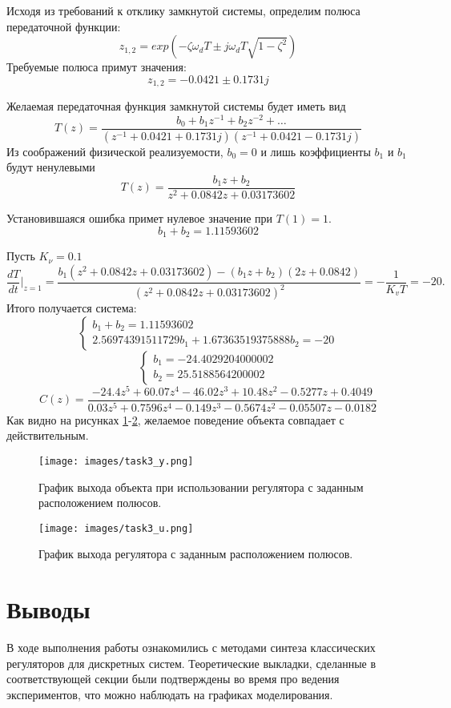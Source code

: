 \documentclass[a4paper, 14pt]{extarticle}
\theoremstyle{definition}
\theoremstyle{plain}
\theoremstyle{remark}
\begin{document}
Исходя из требований к отклику замкнутой системы, определим полюса передаточной функции:
\[z_{1,2} = exp(-\zeta \omega_d T \pm j \omega_d T \sqrt{1 - \zeta^2})\]
Требуемые полюса примут значения:
\[z_{1,2} = -0.0421 \pm 0.1731j \]

Желаемая передаточная функция замкнутой системы будет иметь вид
\[T(z) = \frac{b_0 + b_1 z^{-1} + b_2 z^{-2} + \dots}{(z^{-1} + 0.0421 + 0.1731j)(z^{-1}  + 0.0421 - 0.1731j)}\]
Из соображений физической реализуемости, \(b_0 = 0\) и лишь коэффициенты \(b_1\) и \(b_1\) будут ненулевыми
\[T(z) = \frac{b_1 z + b_2}{z^2 + 0.0842z + 0.03173602}\]

Установившаяся ошибка примет нулевое значение при \(T(1) = 1\).
\[b_1 + b_2 = 1.11593602\]

Пусть \(K_\nu  = 0.1\)
\[
\frac{dT}{dt} \Bigg|_{z=1} = \frac{b_1 ( z^2 + 0.0842z + 0.03173602) - ( b_1 z + b_2 ) ( 2z + 0.0842 )}{(  z^2 + 0.0842z + 0.03173602)^2} = -\frac{1}{K_v T} = -20.
\]
Итого получается система:
\[
\begin{cases}
	b_1 + b_2 = 1.11593602 \\
	2.56974391511729b_1 +1.67363519375888b_2 = -20
\end{cases}
\]  
\[
\begin{cases}
	b_1 = -24.4029204000002 \\
	b_2 = 25.5188564200002
\end{cases}
\]
\[C(z) = \frac{-24.4 z^5 + 60.07 z^4 - 46.02 z^3 + 10.48 z^2 - 0.5277 z + 0.4049}{0.03 z^5 + 0.7596 z^4 - 0.149 z^3 - 0.5674 z^2 - 0.05507 z - 0.0182}\]
Как видно на рисунках \ref{fig:task3_y}-\ref{fig:task3_u}, желаемое поведение объекта совпадает с действительным. 

\begin{figure}
	[H]
	\centering
	\texttt{[image: images/task3\_y.png]}
	\caption{График выхода объекта при использовании регулятора с заданным расположением полюсов.}
	\label{fig:task3_y}
\end{figure}
\begin{figure}
	[H]
	\centering
	\texttt{[image: images/task3\_u.png]}
	\caption{График выхода регулятора с заданным расположением полюсов.}
	\label{fig:task3_u}
\end{figure}



\newpage
\section{Выводы}
В ходе выполнения работы ознакомились с методами синтеза классических регуляторов для дискретных систем. Теоретические выкладки, сделанные в соответствующей секции были подтверждены во время про ведения экспериментов, что можно наблюдать на графиках моделирования.
\end{document}
